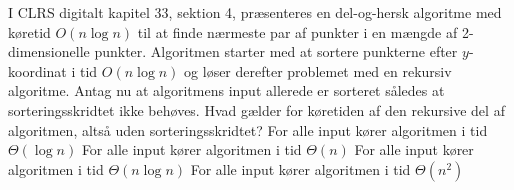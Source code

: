 I CLRS digitalt kapitel 33, sektion 4, præsenteres en del-og-hersk algoritme med køretid $O(n \log n)$ til at finde nærmeste par af punkter i en mængde af 2-dimensionelle punkter.
Algoritmen starter med at sortere punkterne efter $y$-koordinat i tid $O(n \log n)$ og løser derefter problemet med en rekursiv algoritme.
Antag nu at algoritmens input allerede er sorteret således at sorteringsskridtet ikke behøves.
Hvad gælder for køretiden af den rekursive del af algoritmen, altså uden sorteringsskridtet?
\etsvar
\mulighederstart
\svar For alle input kører algoritmen i tid $\Theta(\log n)$
\svar For alle input kører algoritmen i tid $\Theta(n)$
\svar For alle input kører algoritmen i tid $\Theta(n \log n)$ \korrekt
\svar For alle input kører algoritmen i tid $\Theta(n^2)$
\mulighederslut
{}



